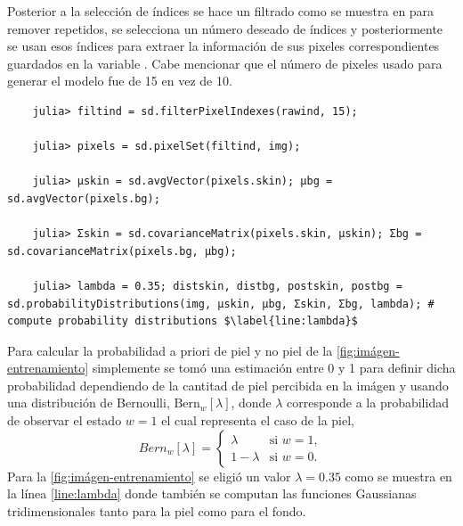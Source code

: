 Posterior a la selección de índices se hace un filtrado como se muestra en  para remover repetidos, se selecciona un número deseado de índices y posteriormente se usan esos índices para extraer la información de sus pixeles correspondientes guardados en la variable . Cabe mencionar que el número de pixeles usado para generar el modelo fue de 15 en vez de 10.
\begin{verbatim}
    julia> filtind = sd.filterPixelIndexes(rawind, 15);

    julia> pixels = sd.pixelSet(filtind, img);

    julia> μskin = sd.avgVector(pixels.skin); μbg = sd.avgVector(pixels.bg);

    julia> Σskin = sd.covarianceMatrix(pixels.skin, μskin); Σbg = sd.covarianceMatrix(pixels.bg, μbg);

    julia> lambda = 0.35; distskin, distbg, postskin, postbg = sd.probabilityDistributions(img, μskin, μbg, Σskin, Σbg, lambda); # compute probability distributions $\label{line:lambda}$
\end{verbatim}

Para calcular la probabilidad a priori de piel y no piel de la \cref{fig:imágen-entrenamiento} simplemente se tomó una estimación entre 0 y 1 para definir dicha probabilidad dependiendo de la cantitad de piel percibida en la imágen y usando una distribución de Bernoulli, $\text{Bern}_{w}[\lambda]$, donde $\lambda$ corresponde a la probabilidad de observar el estado $w = 1$ el cual representa el caso de la piel,
\begin{equation*}
    Bern_{w}[\lambda] = 
    \begin{cases}
        \lambda & \text{si } w = 1 ,\\
        1 - \lambda & \text{si } w = 0 .
    \end{cases}
\end{equation*}
Para la \cref{fig:imágen-entrenamiento} se eligió un valor $\lambda = 0.35$ como se muestra en la línea \ref{line:lambda} donde también se computan las funciones Gaussianas tridimensionales tanto para la piel como para el fondo.

